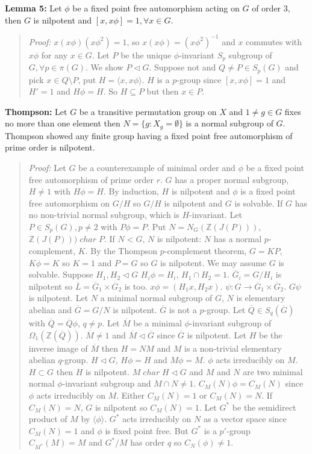 {\bf Lemma 5:} Let $\phi$ be a fixed point free automorphism acting on $G$ of order $3$, then $G$ is
nilpotent and $[x, x\phi]=1, \forall x \in G$.
\begin{quote}
\emph{Proof:}  
$x(x\phi)(x\phi^2)=1$, so $x(x\phi)= (x\phi^2)^{-1}$ and $x$ commutes with $x\phi$ for any $x \in G$.
Let $P$ be the unique $\phi$-invariant $S_p$ subgroup of $G, \forall p \in \pi(G)$.  We show
$P \lhd G$.
Suppose not and
$Q \ne P \in S_p(G)$ and pick $x \in Q \setminus P$, put $H=\langle x, x\phi \rangle$.
$H$ is a $p$-group since $[x, x\phi]=1$ and $H'=1$ and $H \phi = H$.  So $H \subseteq P$ but then
$x \in P$.
\end{quote}
{\bf Thompson:}
Let $G$ be a transitive permutation group on $X$ and $1 \ne g \in G$ fixes
no more than one element then $N= \{g: X_g= \emptyset \}$ is a normal subgroup of $G$.
Thompson showed any finite group having a fixed point free automorphism of prime order is nilpotent.
\begin{quote}
\emph{Proof:}  
Let $G$ be a counterexample of minimal order and $\phi$ be a fixed point free automorphism of prime order $r$.
$G$ has a proper normal subgroup, $H \ne 1$ with $H\phi=H$.  By induction, $H$ is nilpotent and $\phi$
is a fixed point free automorphism on $G/H$ so $G/H$ is nilpotent and $G$ is solvable.  If $G$ has no non-trivial
normal subgroup, which is $H$-invariant.  Let $P \in S_p(G), p \ne 2$ with $P\phi=P$.  Put
$N= N_G({\mathbb Z}(J(P)))$, $ {\mathbb Z}(J(P))) \; char \; P$.  If $N < G$, $N$ is nilpotent:
$N$ has a normal $p$-complement, $K$.  By the Thompson $p$-complement theorem, $G=KP$, $K\phi = K$ so
$K = 1$ and $P=G$ so $G$ is nilpotent.  We may assume $G$ is solvable.
Suppose $H_1, H_2 \lhd G$ $H_i\phi = H_i$, $H_1 \cap H_2 = 1$.  ${\overline G_i} = G/H_i$ is nilpotent
so ${\overline L} = {\overline G_1} \times {\overline G_2}$ is too.  $x\phi = (H_1x, H_2x)$.
$\psi: G \rightarrow {\overline G_1} \times {\overline G_2}$.  $G\psi$ is nilpotent.
Let $N$ a minimal normal subgroup of $G$, $N$ is elementary abelian and ${\overline G} = G/N$ is nilpotent.
${\overline G}$ is not a $p$-group.  Let ${\overline Q} \in S_q({\overline G})$ with 
${\overline Q} = {\overline Q} \phi$, $q \ne p$.  Let ${\overline M}$ be a minimal $\phi$-invariant
subgroup of $\Omega_1({\mathbb Z}({\overline Q}))$.  ${\overline M} \ne 1$ and ${\overline M} \lhd {\overline G}$
since ${\overline G}$ is nilpotent.  Let $H$ be the inverse image of ${\overline M}$ then
$H=NM$ and $M$ is a non-trivial elementary abelian $q$-group.  $H \lhd G$, $H\phi = H$ and $M\phi=M$.
$\phi$ acts irreducibly on $M$.  $H \subset G$ then $H$ is nilpotent.
$M \; char \; H \lhd G$ and $M$ and $N$ are two minimal normal $\phi$-invariant subgroup and
$M \cap N \ne 1$.  $C_M(N)\phi = C_M(N)$ since $\phi$ acts irreducibly on $M$.  Either
$C_M(N) = 1$ or $C_M(N) = N$.
If $C_M(N) = N$, $G$ is nilpotent so $C_M(N) = 1$.  Let $G^*$ be the semidirect product of
$M$ by $\langle \phi \rangle$.  $G^*$ acts irreducibly on $N$ as a vector space since
$C_M(N) = 1$ and $\phi$ is fixed point free.  But $G^*$ is a $p'$-group $C_{M^*}(M) = M$ and
$G^*/M$ has order $q$ so $C_N(\phi) \ne 1$.
\end{quote}
